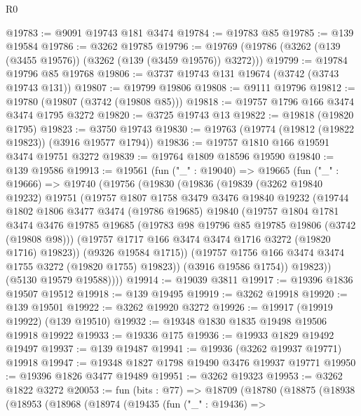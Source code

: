 \begin{lexlean}{R0}
\begin{coremodule}
@19783 := @9091 @19743 @181 @3474
@19784 := @19783 @85
@19785 := @139 @19584
@19786 := @3262 @19785
@19796 := @19769 (@19786 (@3262 (@139 (@3455 @19576)) (@3262 (@139 (@3459 @19576)) @3272)))
@19799 := @19784 @19796 @85 @19768
@19806 := @3737 @19743 @131 @19674 (@3742 (@3743 @19743 @131))
@19807 := @19799 @19806
@19808 := @9111 @19796
@19812 := @19780 (@19807 (@3742 (@19808 @85)))
@19818 := @19757 @1796 @166 @3474 @3474 @1795 @3272
@19820 := @3725 @19743 @13
@19822 := @19818 (@19820 @1795)
@19823 := @3750 @19743
@19830 := @19763 (@19774 (@19812 (@19822 @19823)) (@3916 @19577 @1794))
@19836 := @19757 @1810 @166 @19591 @3474 @19751 @3272
@19839 := @19764 @1809 @18596 @19590
@19840 := @139 @19586
@19913 := @19561
    (fun ("_" : @19040) =>
    @19665
      (fun ("_" : @19666) =>
      @19740
        (@19756
          (@19830
            (@19836
              (@19839
                (@3262 @19840 @19232)
                @19751
                (@19757
                  @1807
                  @1758
                  @3479
                  @3476
                  @19840
                  @19232
                  (@19744
                    @1802
                    @1806
                    @3477
                    @3474
                    (@19786 @19685)
                    @19840
                    (@19757
                      @1804
                      @1781
                      @3474
                      @3476
                      @19785
                      @19685
                      (@19783 @98 @19796 @85 @19785 @19806 (@3742 (@19808 @98)))
                      (@19757 @1717 @166 @3474 @3474 @1716 @3272 (@19820 @1716) @19823))
                    (@9326 @19584 @1715))
                  (@19757 @1756 @166 @3474 @3474 @1755 @3272 (@19820 @1755) @19823))
                (@3916 @19586 @1754))
              @19823))
          (@5130 @19579 @19588))))
@19914 := @19039 @3811
@19917 := @19396 @1836 @19507 @19512
@19918 := @139 @19495
@19919 := @3262 @19918
@19920 := @139 @19501
@19922 := @3262 @19920 @3272
@19926 := @19917 (@19919 @19922) (@139 @19510)
@19932 := @19348 @1830 @1835 @19498 @19506 @19918 @19922
@19933 := @19336 @175
@19936 := @19933 @1829 @19492 @19497
@19937 := @139 @19487
@19941 := @19936 (@3262 @19937 @19771) @19918
@19947 := @19348 @1827 @1798 @19490 @3476 @19937 @19771
@19950 := @19396 @1826 @3477 @19489
@19951 := @3262 @19323
@19953 := @3262 @1822 @3272
@20053 := fun (bits : @77) =>
  @18709
    (@18780
      (@18875
        (@18938
          (@18953
            (@18968
              (@18974
                (@19435
                  (fun ("_" : @19436) =>

\end{coremodule}
\end{lexlean}
